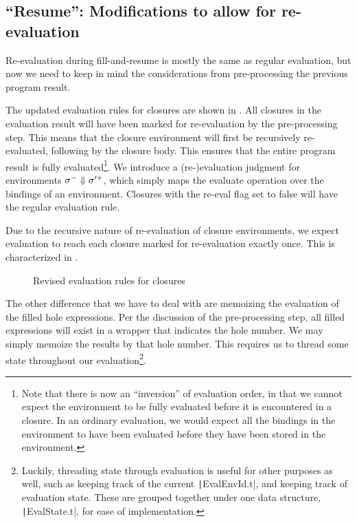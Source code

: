 \subsection{``Resume'': Modifications to allow for re-evaluation}
\label{sec:re-eval}

Re-evaluation during fill-and-resume is mostly the same as regular evaluation, but now we need to keep in mind the considerations from pre-processing the previous program result.

The updated evaluation rules for closures are shown in . All closures in the evaluation result will have been marked for re-evaluation by the pre-processing step. This means that the closure environment will first be recursively re-evaluated, following by the closure body. This ensures that the entire program result is fully evaluated\footnote{Note that there is now an ``inversion'' of evaluation order, in that we cannot expect the environment to be fully evaluated before it is encountered in a closure. In an ordinary evaluation, we would expect all the bindings in the environment to have been evaluated before they have been stored in the environment.}. We introduce a (re-)evaluation judgment for environments $\sigma^-\Downarrow\sigma'^+$, which simply maps the evaluate operation over the bindings of an environment. Closures with the re-eval flag set to false will have the regular evaluation rule.

Due to the recursive nature of re-evaluation of closure environments, we expect evaluation to reach each closure marked for re-evaluation exactly once. This is characterized in .

\begin{figure}
  \centering
  \begin{mdframed}
    \begin{singlespace}
      
    \end{singlespace}
  \end{mdframed}
  \caption{Revised evaluation rules for closures}
  \label{fig:reeval-closures}
\end{figure}

The other difference that we have to deal with are memoizing the evaluation of the filled hole expressions. Per the discussion of the pre-processing step, all filled expressions will exist in a wrapper that indicates the hole number. We may simply memoize the results by that hole number. This requires us to thread some state throughout our evaluation\footnote{Luckily, threading state through evaluation is useful for other purposes as well, such as keeping track of the current \texttt|EvalEnvId.t|, and keeping track of evaluation state. These are grouped together under one data structure, \texttt|EvalState.t|, for ease of implementation.}.

